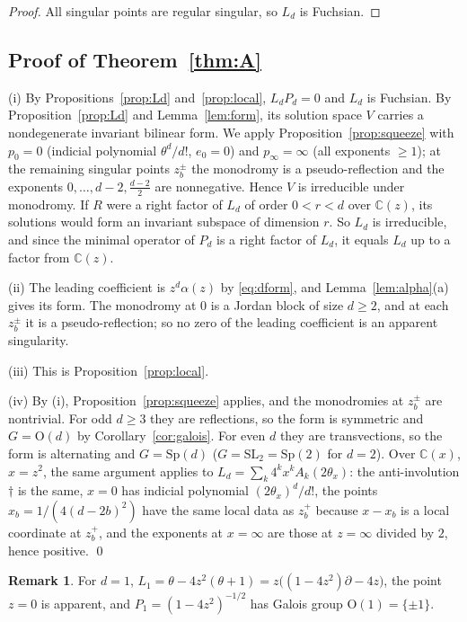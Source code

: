 \documentclass[11pt]{amsart}
\theoremstyle{definition}
\newtheorem{remark}[thm]{Remark}
\newcommand{\C}{\mathbb C}
\newcommand{\SL}{\mathrm{SL}}
\newcommand{\Sp}{\mathrm{Sp}}
\newcommand{\Ort}{\mathrm{O}}
\begin{document}
\begin{proof}
All singular points are regular singular, so $L_d$ is Fuchsian.
\end{proof}

\subsection{Proof of \texorpdfstring{Theorem~\ref{thm:A}}{Theorem A}}
(i) By Propositions~\ref{prop:Ld} and~\ref{prop:local}, $L_dP_d=0$ and $L_d$ is Fuchsian. By Proposition~\ref{prop:Ld} and Lemma~\ref{lem:form}, its solution space $V$ carries a nondegenerate invariant bilinear form. We apply Proposition~\ref{prop:squeeze} with $p_0=0$ (indicial polynomial $\theta^d/d!$, $e_0=0$) and $p_\infty=\infty$ (all exponents $\ge1$); at the remaining singular points $z_b^\pm$ the monodromy is a pseudo-reflection and the exponents $0,\dots,d-2,\frac{d-2}2$ are nonnegative. Hence $V$ is irreducible under monodromy. If $R$ were a right factor of $L_d$ of order $0<r<d$ over $\C(z)$, its solutions would form an invariant subspace of dimension $r$. So $L_d$ is irreducible, and since the minimal operator of $P_d$ is a right factor of $L_d$, it equals $L_d$ up to a factor from $\C(z)$.

(ii) The leading coefficient is $z^d\alpha(z)$ by \eqref{eq:dform}, and Lemma~\ref{lem:alpha}(a) gives its form. The monodromy at $0$ is a Jordan block of size $d\ge2$, and at each $z_b^\pm$ it is a pseudo-reflection; so no zero of the leading coefficient is an apparent singularity.

(iii) This is Proposition~\ref{prop:local}.

(iv) By (i), Proposition~\ref{prop:squeeze} applies, and the monodromies at $z_b^\pm$ are nontrivial. For odd $d\ge3$ they are reflections, so the form is symmetric and $G=\Ort(d)$ by Corollary~\ref{cor:galois}. For even $d$ they are transvections, so the form is alternating and $G=\Sp(d)$ ($G=\SL_2=\Sp(2)$ for $d=2$). Over $\C(x)$, $x=z^2$, the same argument applies to $L_d=\sum_k4^kx^kA_k(2\theta_x)$: the anti-involution $\dagger$ is the same, $x=0$ has indicial polynomial $(2\theta_x)^d/d!$, the points $x_b=1/(4(d-2b)^2)$ have the same local data as $z_b^+$ because $x-x_b$ is a local coordinate at $z_b^+$, and the exponents at $x=\infty$ are those at $z=\infty$ divided by $2$, hence positive. \qed

\begin{remark}
For $d=1$, $L_1=\theta-4z^2(\theta+1)=z\bigl((1-4z^2)\partial-4z\bigr)$, the point $z=0$ is apparent, and $P_1=(1-4z^2)^{-1/2}$ has Galois group $\Ort(1)=\{\pm1\}$.
\end{remark}
\end{document}
